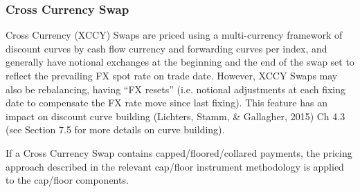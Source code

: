 \subsubsection{Cross Currency Swap}
\label{pricing:ir_ccs}

Cross Currency (XCCY) Swaps are priced using a multi-currency framework of discount 
curves by cash flow currency and forwarding curves per index, and generally have 
notional exchanges at the beginning and the end of the swap set to reflect the 
prevailing FX spot rate on trade date.  However, XCCY Swaps may also be rebalancing, 
having ``FX resets'' (i.e. notional adjustments at each fixing date to compensate the 
FX rate move since last fixing).  This feature has an impact on discount curve 
building (Lichters, Stamm, \& Gallagher, 2015) Ch 4.3 (see Section 7.5 for more 
details on curve building).

\medskip
If a Cross Currency Swap contains capped/floored/collared payments, the pricing 
approach described in the relevant cap/floor instrument methodology is applied 
to the cap/floor components.


